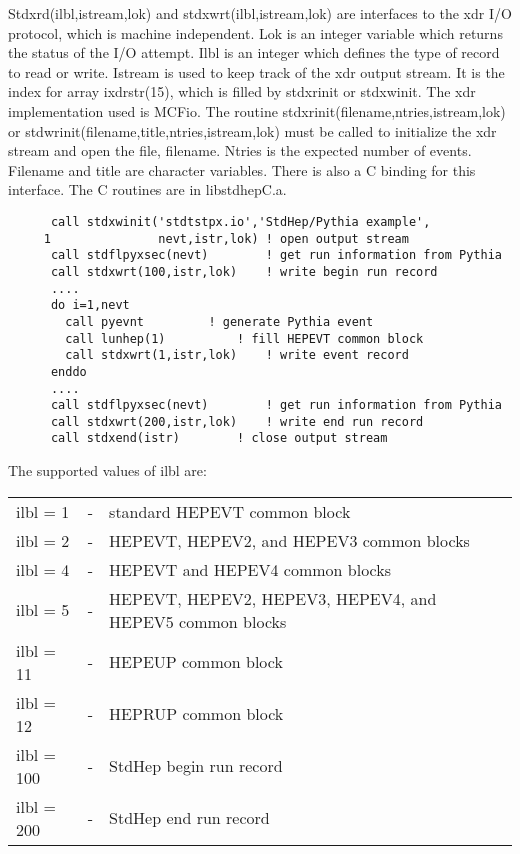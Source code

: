 Stdxrd(ilbl,istream,lok) and stdxwrt(ilbl,istream,lok) are interfaces
to the xdr I/O protocol, which is machine independent.  
Lok is an integer variable which returns the status of the I/O attempt.
Ilbl is an integer which defines the type of record to read or write.
Istream is used to keep track of the xdr output stream.  It is the index
for array ixdrstr(15), which is filled by stdxrinit or stdxwinit.
The xdr implementation used is MCFio.  
The routine stdxrinit(filename,ntries,istream,lok)
or stdwrinit(filename,title,ntries,istream,lok) must be called 
to initialize the xdr stream and open the file, filename.  
Ntries is the expected number of events.
Filename and title are character variables.
There is also a C binding for this interface.  The C routines are
in libstdhepC.a.

\begin{verbatim}
      call stdxwinit('stdtstpx.io','StdHep/Pythia example',
     1               nevt,istr,lok)	! open output stream
      call stdflpyxsec(nevt)		! get run information from Pythia
      call stdxwrt(100,istr,lok)	! write begin run record
      ....
      do i=1,nevt
        call pyevnt			! generate Pythia event
        call lunhep(1)			! fill HEPEVT common block
        call stdxwrt(1,istr,lok)	! write event record
      enddo
      ....
      call stdflpyxsec(nevt)		! get run information from Pythia
      call stdxwrt(200,istr,lok)	! write end run record
      call stdxend(istr)		! close output stream
\end{verbatim}

\noindent The supported values of ilbl are:

\begin{center}
\begin{tabular}{lcll}
ilbl = 1   &-& standard HEPEVT common block \\
ilbl = 2   &-& HEPEVT, HEPEV2, and HEPEV3 common blocks \\
ilbl = 4   &-& HEPEVT and HEPEV4 common blocks \\
ilbl = 5   &-& HEPEVT, HEPEV2, HEPEV3, HEPEV4, and HEPEV5 common blocks \\
ilbl = 11  &-& HEPEUP common block \\
ilbl = 12  &-& HEPRUP common block \\
ilbl = 100 &-& StdHep begin run record \\
ilbl = 200 &-& StdHep end run record \\
\end{tabular}
\end{center}

